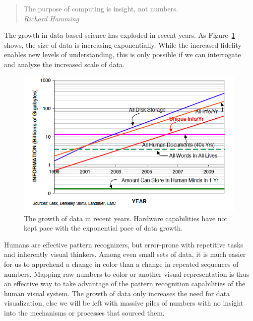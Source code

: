 \begin{quote}
	The purpose of computing is insight, not numbers.\\
	\indent \indent \textit{Richard Hamming}
\end{quote}

The growth in data-based science has exploded in recent years.  As
Figure~\ref{fig:growth} shows, the size of data is increasing
exponentially.  While the increased fidelity enables new levels of
understanding, this is only possible if we can interrogate and analyze
the increased scale of data.

\begin{figure}
	\includegraphics[width=\linewidth]{images/growth}

  \caption{The growth of data in recent years.  Hardware capabilities
  have not kept pace with the exponential pace of data growth.}

	\label{fig:growth}
\end{figure}

Humans are effective pattern recognizers, but error-prone with
repetitive tasks and inherently visual thinkers.  Among even small sets
of data, it is much easier for us to apprehend a change in color than
a change in repeated sequences of numbers.  Mapping raw
numbers to color or another visual representation is thus an effective
way to take advantage of the pattern recognition capabilities of the
human visual system.  The growth of data only increases the need for
data visualization, else we will be left with massive piles of numbers
with no insight into the mechanisms or processes that sourced them.

